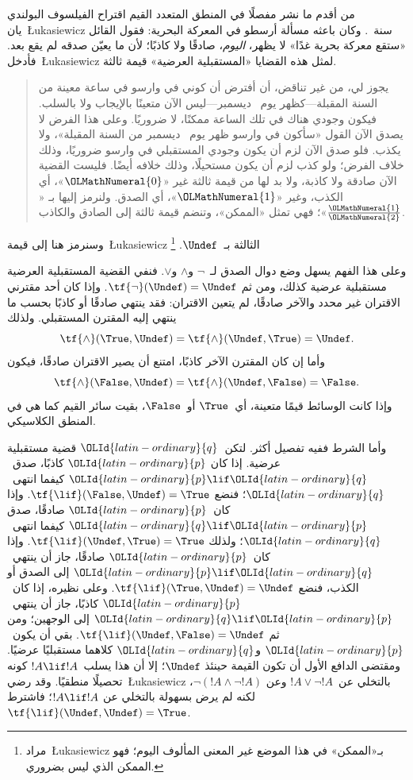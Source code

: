 \documentclass[../../../include/open-logic-section]{subfiles}
\begin{document}


من أقدم ما نشر مفصلًا في المنطق المتعدد القيم اقتراح الفيلسوف
البولندي يان~\L ukasiewicz سنة~. وكان باعثه مسألة أرسطو في
المعركة البحرية: فقول القائل «ستقع معركة بحرية غدًا» لا يظهر،
\emph{اليوم}، صادقًا ولا كاذبًا؛ لأن ما يعيّن صدقه لم يقع بعد.
فأدخل~\L ukasiewicz لمثل هذه القضايا «المستقبلية العرضية» قيمة ثالثة.
\begin{quote}
يجوز لي، من غير تناقض، أن أفترض أن كوني في وارسو في ساعة معينة من
السنة المقبلة---كظهر يوم~ ديسمبر---ليس الآن متعينًا بالإيجاب ولا
بالسلب. فيكون وجودي هناك في تلك الساعة ممكنًا، لا ضروريًا. وعلى هذا
الفرض لا يصدق الآن القول «سأكون في وارسو ظهر يوم~ ديسمبر من السنة
المقبلة»، ولا يكذب. فلو صدق الآن لزم أن يكون وجودي المستقبلي في وارسو
ضروريًا، وذلك خلاف الفرض؛ ولو كذب لزم أن يكون مستحيلًا، وذلك خلافه
أيضًا. فليست القضية الآن صادقة ولا كاذبة، ولا بد لها من قيمة ثالثة
غير «$\OLMathNumeral{0}$»، أي الكذب، وغير «$\OLMathNumeral{1}$»، أي الصدق. ولنرمز إليها بـ
«$\frac{\OLMathNumeral{1}}{\OLMathNumeral{2}}$»؛ فهي تمثل «الممكن»، وتنضم قيمة ثالثة إلى الصادق
والكاذب.
\end{quote}
وسنرمز هنا إلى قيمة~\L ukasiewicz الثالثة بـ~$\Undef$.
\footnote{مراد~\L ukasiewicz بـ«الممكن» في هذا الموضع غير المعنى
المألوف اليوم؛ فهو الممكن الذي ليس بضروري.}

وعلى هذا الفهم يسهل وضع دوال الصدق لـ~$\lnot$ و$\land$ و$\lor$.
فنفي القضية المستقبلية العرضية مستقبلية عرضية كذلك، ومن ثم
$\tf{\lnot}(\Undef) = \Undef$. وإذا كان أحد مقترني الاقتران غير
محدد والآخر صادقًا، لم يتعين الاقتران: فقد ينتهي صادقًا أو كاذبًا
بحسب ما ينتهي إليه المقترن المستقبلي. ولذلك
\[
    \tf{\land}(\True, \Undef) =
\tf{\land}(\Undef, \True) =
\Undef.
\]
وأما إن كان المقترن الآخر كاذبًا، امتنع أن يصير الاقتران صادقًا،
فيكون
\[\tf{\land}(\False, \Undef) =
\tf{\land}(\Undef, \False) = \False.\]
وإذا كانت الوسائط قيمًا متعينة، أي~$\True$ أو~$\False$، بقيت سائر
القيم كما هي في المنطق الكلاسيكي.

وأما الشرط ففيه تفصيل أكثر. لتكن~$\OLId{latin-ordinary}{q}$ قضية مستقبلية عرضية. إذا كان
$\OLId{latin-ordinary}{p}$ كاذبًا، صدق~$\OLId{latin-ordinary}{p} \lif \OLId{latin-ordinary}{q}$ كيفما انتهى~$\OLId{latin-ordinary}{q}$؛ فنضع
$\tf{\lif}(\False, \Undef) = \True$. وإذا كان~$\OLId{latin-ordinary}{p}$ صادقًا، صدق
$\OLId{latin-ordinary}{q} \lif \OLId{latin-ordinary}{p}$ كيفما انتهى~$\OLId{latin-ordinary}{q}$؛ ولذلك
$\tf{\lif}(\Undef, \True) = \True$. وإذا كان~$\OLId{latin-ordinary}{p}$ صادقًا، جاز أن
ينتهي~$\OLId{latin-ordinary}{p} \lif \OLId{latin-ordinary}{q}$ إلى الصدق أو الكذب، فنضع
$\tf{\lif}(\True, \Undef) = \Undef$. وعلى نظيره، إذا كان~$\OLId{latin-ordinary}{p}$
كاذبًا، جاز أن ينتهي~$\OLId{latin-ordinary}{q} \lif \OLId{latin-ordinary}{p}$ إلى الوجهين؛ ومن ثم
$\tf{\lif}(\Undef, \False) = \Undef$. بقي أن يكون~$\OLId{latin-ordinary}{p}$ و$\OLId{latin-ordinary}{q}$
كلاهما مستقبليًا عرضيًا. ومقتضى الدافع الأول أن تكون القيمة حينئذ
$\Undef$؛ إلا أن هذا يسلب~$!A \lif !A$ كونه تحصيلًا منطقيًا.
وقد رضي~\L ukasiewicz بالتخلي عن~$!A \lor \lnot !A$ وعن
$\lnot(!A \land \lnot !A)$، لكنه لم يرض بسهولة بالتخلي عن
$!A \lif !A$؛ فاشترط~$\tf{\lif}(\Undef, \Undef) = \True$.
\end{document}
